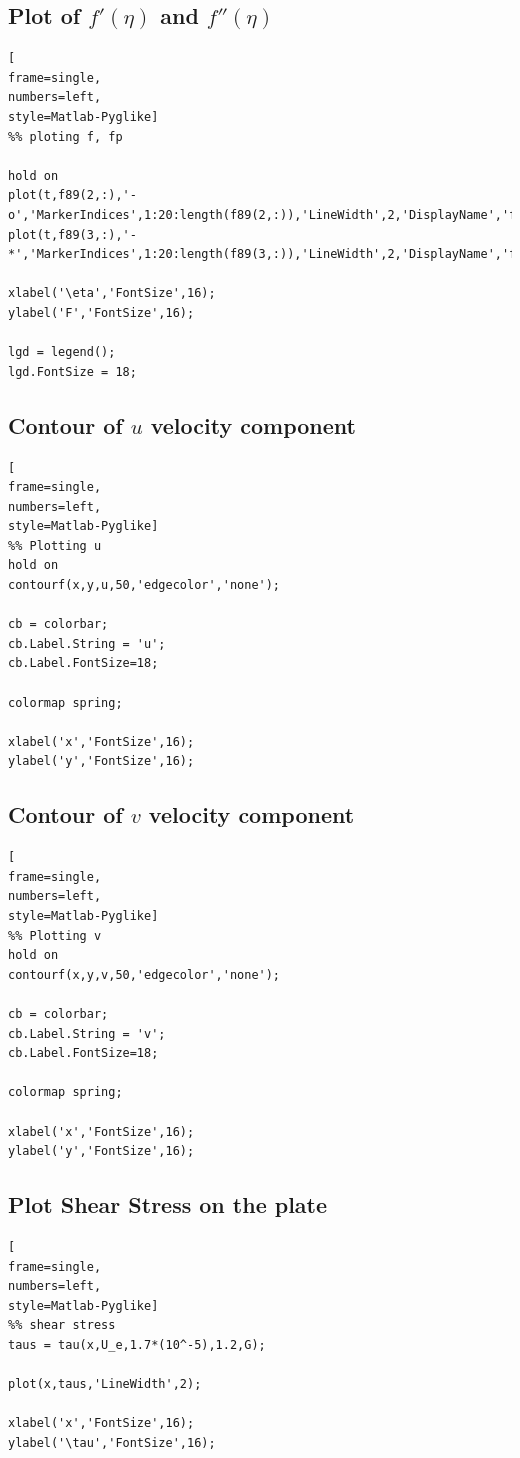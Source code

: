 \documentclass[]{report}
\begin{document}
\subsection{Plot of $f'(\eta)$ and $f''(\eta)$}
\label{func:bla_sol}
\begin{lstlisting}[
frame=single,
numbers=left,
style=Matlab-Pyglike]
%% ploting f, fp

hold on
plot(t,f89(2,:),'-o','MarkerIndices',1:20:length(f89(2,:)),'LineWidth',2,'DisplayName','f''(\eta)');
plot(t,f89(3,:),'-*','MarkerIndices',1:20:length(f89(3,:)),'LineWidth',2,'DisplayName','f''''(\eta)');

xlabel('\eta','FontSize',16);
ylabel('F','FontSize',16);

lgd = legend();
lgd.FontSize = 18;
\end{lstlisting}

\subsection{Contour of $u$ velocity component}
\label{func:u}
\begin{lstlisting}[
frame=single,
numbers=left,
style=Matlab-Pyglike]
%% Plotting u
hold on
contourf(x,y,u,50,'edgecolor','none');

cb = colorbar;
cb.Label.String = 'u';
cb.Label.FontSize=18;

colormap spring;

xlabel('x','FontSize',16);
ylabel('y','FontSize',16);
\end{lstlisting}

\subsection{Contour of $v$ velocity component}
\label{func:v}
\begin{lstlisting}[
frame=single,
numbers=left,
style=Matlab-Pyglike]
%% Plotting v
hold on
contourf(x,y,v,50,'edgecolor','none');

cb = colorbar;
cb.Label.String = 'v';
cb.Label.FontSize=18;

colormap spring;

xlabel('x','FontSize',16);
ylabel('y','FontSize',16);
\end{lstlisting}

\subsection{Plot Shear Stress on the plate}
\label{func:tau}
\begin{lstlisting}[
frame=single,
numbers=left,
style=Matlab-Pyglike]
%% shear stress
taus = tau(x,U_e,1.7*(10^-5),1.2,G);

plot(x,taus,'LineWidth',2);

xlabel('x','FontSize',16);
ylabel('\tau','FontSize',16);
\end{lstlisting}
\end{document}
